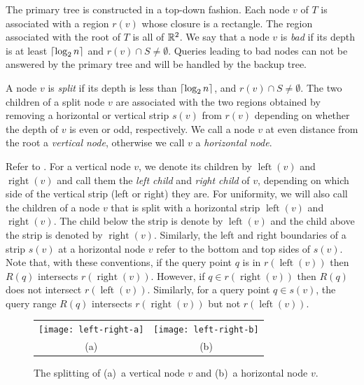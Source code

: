 \documentclass{patmorin}
\DeclareMathOperator{\lft}{left}
\DeclareMathOperator{\rght}{right}
\begin{document}
The primary tree is constructed in a top-down fashion.  Each node $v$
of $T$ is associated with a region $r(v)$ whose closure is a rectangle.
The region associated with the root of $T$ is all of $\mathbb{R}^2$.  We say
that a node $v$ is \emph{bad} if its depth is at least $\left\lceil \log_2 n \right\rceil$
and $r(v)\cap S \neq \emptyset$.  Queries leading to bad nodes can not
be answered by the primary tree and will be handled by the backup tree.

A node $v$ is \emph{split} if its depth is less than $\left\lceil \log_2 n \right\rceil$,
and $r(v)\cap S\neq \emptyset$.  The two children of a split node $v$
are associated with the two regions obtained by removing a horizontal or
vertical strip $s(v)$ from $r(v)$ depending on whether the depth of $v$
is even or odd, respectively.  We call a node $v$ at even distance from
the root a \emph{vertical node}, otherwise we call $v$ a \emph{horizontal
node}.

Refer to .  For a vertical node $v$, we denote its
children by $\lft(v)$ and $\rght(v)$ and call them the \emph{left child}
and \emph{right child} of $v$, depending on which side of the vertical
strip (left or right) they are.  For uniformity, we will also call the
children of a node $v$ that is split with a horizontal strip $\lft(v)$ and
$\rght(v)$.  The child below the strip is denote by $\lft(v)$ and the child
above the strip is denoted by $\rght(v)$.  Similarly, the left and right
boundaries of a strip $s(v)$ at a horizontal node $v$ refer to the bottom
and top sides of $s(v)$.  Note that, with these conventions, if the query
point $q$ is in $r(\lft(v))$ then $R(q)$ intersects $r(\rght(v))$.
However, if $q\in r(\rght(v))$ then $R(q)$ does not intersect $r(\lft(v))$.
Similarly, for a query point $q\in s(v)$, the query range $R(q)$ intersects
$r(\rght(v))$ but not $r(\lft(v))$.

\begin{figure}
  \begin{center}
    \begin{tabular}{cc}
      \texttt{[image: left-right-a]} & \texttt{[image: left-right-b]} \\
      (a) & (b)
    \end{tabular}
  \end{center}
  \caption{The splitting of (a)~a vertical node $v$ and (b)~a horizontal
  node $v$.}
\end{figure}
\end{document}

